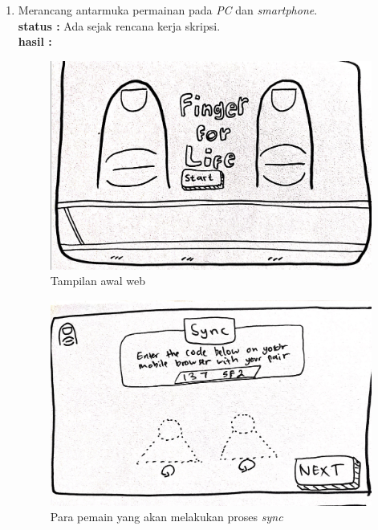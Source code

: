 \documentclass[a4paper,twoside]{article}
\begin{document}
\begin{enumerate}
		\item Merancang antarmuka permainan pada \textit{PC} dan \textit{smartphone}.\\
		{\bf status :} Ada sejak rencana kerja skripsi.\\
		{\bf hasil :} \\
		
		\begin{figure}[H]
			\centering
			\includegraphics[scale=0.1]{Gambar/web1_home}
			\caption{Tampilan awal web}
			\label{fig:1_web1_home}
		\end{figure}
	
		\begin{figure}[H]
			\centering
			\includegraphics[scale=0.1]{Gambar/web2_sync1}
			\caption{Para pemain yang akan melakukan proses \textit{sync}}
			\label{fig:2_web2_sync1}
		\end{figure}
	

\end{enumerate}
\end{document}
